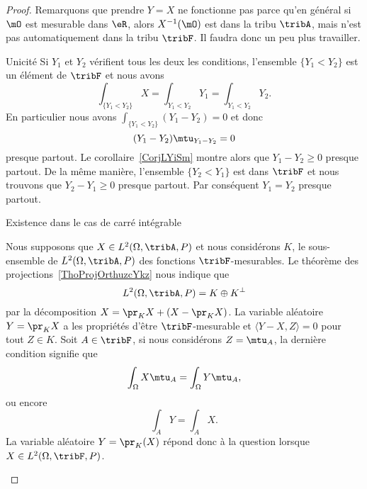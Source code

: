 \begin{proof}
        Remarquons que prendre \( Y=X\) ne fonctionne pas parce qu'en général si \( \mO\) est mesurable dans \( \eR\), alors \( X^{-1}(\mO)\) est dans la tribu \( \tribA\), mais n'est pas automatiquement dans la tribu \( \tribF\). Il faudra donc un peu plus travailler.
    \begin{subproof}
        \item[Unicité] Si \( Y_1\) et \( Y_2\) vérifient tous les deux les conditions, l'ensemble \( \{ Y_1<Y_2 \}\) est un élément de \( \tribF\) et nous avons
            \begin{equation}
                \int_{\{ Y_1<Y_2 \}}X=\int_{Y_1<Y_2}Y_1=\int_{Y_1<Y_2}Y_2.
            \end{equation}
            En particulier nous avons \( \int_{\{ Y_1<Y_2 \}}(Y_1-Y_2)=0\) et donc
            \begin{equation}
                (Y_1-Y_2)\mtu_{Y_1-Y_2}=0
            \end{equation}
            presque partout. Le corollaire~\ref{CorjLYiSm} montre alors que \( Y_1-Y_2\geq 0\) presque partout. De la même manière, l'ensemble \( \{ Y_2<Y_1 \}\) est dans \( \tribF\) et nous trouvons que \( Y_2-Y_1\geq 0\) presque partout. Par conséquent \( Y_1=Y_2\) presque partout.
        \item[Existence dans le cas de carré intégrable]

            Nous supposons que \( X\in L^2(\Omega,\tribA,P)\) et nous considérons \( K\), le sous-ensemble de \( L^2(\Omega,\tribA,P)\) des fonctions \( \tribF\)-mesurables. Le théorème des projections~\ref{ThoProjOrthuzcYkz} nous indique que
            \begin{equation}
                L^2(\Omega,\tribA,P)=K\oplus K^{\perp}
            \end{equation}
            par la décomposition \( X=\pr_{K}X+(X-\pr_KX)\). La variable aléatoire \( Y=\pr_KX\) a les propriétés d'être \( \tribF\)-mesurable et \( \langle Y-X, Z\rangle =0\) pour tout \( Z\in K\). Soit \( A\in\tribF\), si nous considérons \( Z=\mtu_A\), la dernière condition signifie que
            \begin{equation}
                \int_{\Omega}X\mtu_A=\int_{\Omega}Y\mtu_A,
            \end{equation}
            ou encore
            \begin{equation}
                \int_AY=\int_AX.
            \end{equation}
            La variable aléatoire \( Y=\pr_K(X)\) répond donc à la question lorsque \( X\in L^2(\Omega,\tribF,P)\).


\end{subproof}
\end{proof}
